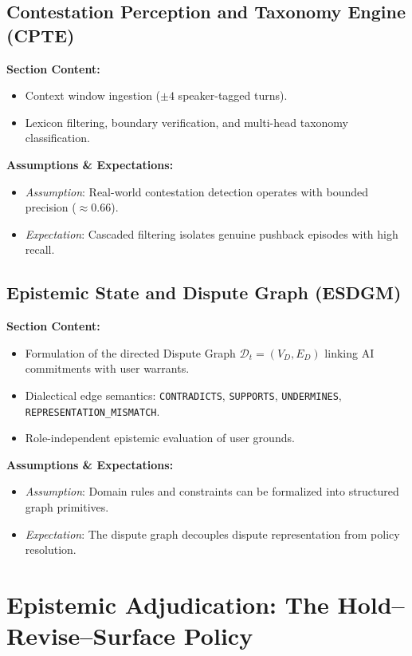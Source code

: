 \documentclass[preprint,12pt,3p,times]{elsarticle}
\begin{document}
\subsection{Contestation Perception and Taxonomy Engine (CPTE)}
\textbf{Section Content:}
\begin{itemize}
    \item Context window ingestion ($\pm 4$ speaker-tagged turns).
    \item Lexicon filtering, boundary verification, and multi-head taxonomy classification.
\end{itemize}

\textbf{Assumptions \& Expectations:}
\begin{itemize}
    \item \emph{Assumption}: Real-world contestation detection operates with bounded precision ($\approx 0.66$).
    \item \emph{Expectation}: Cascaded filtering isolates genuine pushback episodes with high recall.
\end{itemize}

\subsection{Epistemic State and Dispute Graph (ESDGM)}
\textbf{Section Content:}
\begin{itemize}
    \item Formulation of the directed Dispute Graph $\mathcal{D}_t = (V_D, E_D)$ linking AI commitments with user warrants.
    \item Dialectical edge semantics: \texttt{CONTRADICTS}, \texttt{SUPPORTS}, \texttt{UNDERMINES}, \texttt{REPRESENTATION\_MISMATCH}.
    \item Role-independent epistemic evaluation of user grounds.
\end{itemize}

\textbf{Assumptions \& Expectations:}
\begin{itemize}
    \item \emph{Assumption}: Domain rules and constraints can be formalized into structured graph primitives.
    \item \emph{Expectation}: The dispute graph decouples dispute representation from policy resolution.
\end{itemize}

\section{Epistemic Adjudication: The Hold--Revise--Surface Policy}
\label{sec:adjudication}
\end{document}
